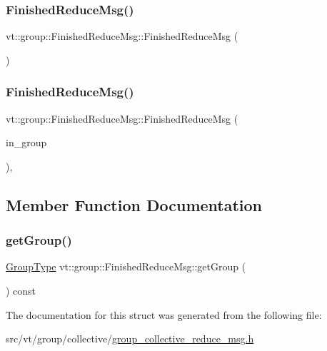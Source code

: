 \subsubsection{\texorpdfstring{Finished\+Reduce\+Msg()}{FinishedReduceMsg()}\hspace{0.1cm}{\footnotesize\ttfamily [1/2]}}
{\footnotesize\ttfamily vt\+::group\+::\+Finished\+Reduce\+Msg\+::\+Finished\+Reduce\+Msg (\begin{DoxyParamCaption}{ }\end{DoxyParamCaption})\hspace{0.3cm}{\ttfamily [default]}}

\mbox{\label{structvt_1_1group_1_1_finished_reduce_msg_a5be4d7bc5a37d820ba93c02fcf1c4055}} 
\subsubsection{\texorpdfstring{Finished\+Reduce\+Msg()}{FinishedReduceMsg()}\hspace{0.1cm}{\footnotesize\ttfamily [2/2]}}
{\footnotesize\ttfamily vt\+::group\+::\+Finished\+Reduce\+Msg\+::\+Finished\+Reduce\+Msg (\begin{DoxyParamCaption}\item[{\hyperlink{namespacevt_a27b5e4411c9b6140c49100e050e2f743}{Group\+Type} const \&}]{in\+\_\+group }\end{DoxyParamCaption})\hspace{0.3cm}{\ttfamily [inline]}, {\ttfamily [explicit]}}



\subsection{Member Function Documentation}
\mbox{\label{structvt_1_1group_1_1_finished_reduce_msg_af8357b5d9faa6df84ba31746f66ac979}} 
\subsubsection{\texorpdfstring{get\+Group()}{getGroup()}}
{\footnotesize\ttfamily \hyperlink{namespacevt_a27b5e4411c9b6140c49100e050e2f743}{Group\+Type} vt\+::group\+::\+Finished\+Reduce\+Msg\+::get\+Group (\begin{DoxyParamCaption}{ }\end{DoxyParamCaption}) const\hspace{0.3cm}{\ttfamily [inline]}}



The documentation for this struct was generated from the following file\+:\begin{DoxyCompactItemize}
\item 
src/vt/group/collective/\hyperlink{group__collective__reduce__msg_8h}{group\+\_\+collective\+\_\+reduce\+\_\+msg.\+h}\end{DoxyCompactItemize}
